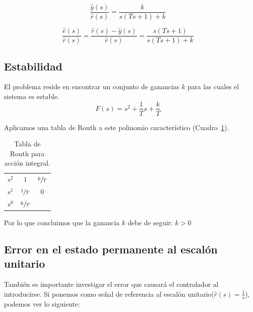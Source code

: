         \begin{equation}
            \frac{\hat{y}(s)}{\hat{r}(s)} = \frac{k}{s(Ts + 1) + k}
        \end{equation}

        \begin{equation}
            \frac{\hat{e}(s)}{\hat{r}(s)} = \frac{\hat{r}(s) - \hat{y}(s)}{\hat{r}(s)} = \frac{s(Ts + 1)}{s(Ts + 1) + k}
        \end{equation}


        \subsection{Estabilidad}
            El problema reside en encontrar un conjunto de ganancias $k$ para las cuales el sistema es estable.
            \begin{equation}
                F(s) = s^2 + \frac{1}{T} s + \frac{k}{T}
            \end{equation}

            Aplicamos una tabla de Routh a este polinomio característico (Cuadro~\ref{tab:AccionIntegral}).

            \begin{table}[htbp]
                \centering
                \begin{tabular}{c|c c}
                $s^2$ & $1$ & $\sfrac{k}{T}$ \\
                $s^1$ & $\sfrac{1}{T}$ & $0$ \\
                $s^0$ & $\sfrac{k}{T}$
                \end{tabular}
                \caption{\label{tab:AccionIntegral}Tabla de Routh para acción integral.}
            \end{table}

            Por lo que concluimos que la ganancia $k$ debe de seguir: $k>0$


        \subsection{Error en el estado permanente al escalón unitario}
            También es importante investigar el error que causará el controlador al introducirse. Si ponemos como señal de referencia al escalón unitario($\hat{r}(s) = \frac{1}{s}$), podemos ver lo siguiente:

